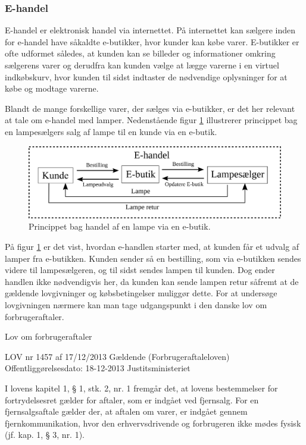 \subsubsection{E-handel}
\label{sec:ehandel}
E-handel er elektronisk handel via internettet\cite{ddo_ehandel}. På internettet kan sælgere inden for e-handel have såkaldte e-butikker, hvor kunder kan købe varer\cite{ddo_ebutik}. E-butikker er ofte udformet således, at kunden kan se billeder og informationer omkring sælgerens varer og derudfra kan kunden vælge at lægge varerne i en virtuel indkøbskurv, hvor kunden til sidst indtaster de nødvendige oplysninger for at købe og modtage varerne.

Blandt de mange forskellige varer, der sælges via e-butikker, er det her relevant at tale om e-handel med lamper. Nedenstående figur \ref{fig:e_handel_med_lamper} illustrerer princippet bag en lampesælgers salg af lampe til en kunde via en e-butik.

\begin{figure}[H]
	\includegraphics{e_handel_med_lampe}
	\caption{Princippet bag handel af en lampe via en e-butik.}
    \label{fig:e_handel_med_lamper}
\end{figure}

På figur \ref{fig:e_handel_med_lamper} er det vist, hvordan e-handlen starter med, at kunden får et udvalg af lamper fra e-butikken. Kunden sender så en bestilling, som via e-butikken sendes videre til lampesælgeren, og til sidst sendes lampen til kunden. Dog ender handlen ikke nødvendigvis her, da kunden kan sende lampen retur såfremt at de gældende lovgivninger og købsbetingelser muliggør dette. For at undersøge lovgivningen nærmere kan man tage udgangspunkt i den danske lov om forbrugeraftaler\cite{retsinformationen}.

%
Lov om forbrugeraftaler

LOV nr 1457 af 17/12/2013 Gældende
(Forbrugeraftaleloven)
Offentliggørelsesdato: 18-12-2013
Justitsministeriet
%

I lovens kapitel 1, § 1, stk. 2, nr. 1 fremgår det, at lovens bestemmelser for fortrydelsesret gælder for aftaler, som er indgået ved fjernsalg. For en  fjernsalgsaftale gælder der, at aftalen om varer, er indgået gennem fjernkommunikation, hvor den erhvervsdrivende og forbrugeren ikke mødes fysisk (jf. kap. 1, § 3, nr. 1).

